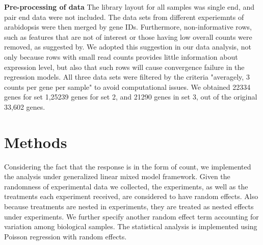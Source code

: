 \documentclass[11pt, a4paper]{article}
\begin{document}
\textbf{Pre-processing of data} The library layout for all samples was single end, and pair end data were not included. The data sets from different experiemnts of arabidopsis were then merged by gene IDs.  Furthermore, non-informative rows, such as features that are not of interest or those having low overall counts were removed, as suggested by\cite{anders2013count}. We adopted this suggestion in our data analysis, not only because rows with small read counts provides little information about expression level,  but also that such rows will cause convergence failure in the regression models. All three data sets  were filtered by the criteria "averagely, 3 counts per gene per sample" to avoid computational issues. We obtained 22334 genes for set 1,25239 genes for set 2, and 21290 genes in set 3, out of the original 33,602 genes. 

\section{Methods}
Considering the fact that the response is in the form of count, we implemented the analysis under generalized linear mixed model framework\nocite{mccullagh1989generalized}. Given the randomness of experimental data we collected, the experiments, as well as the treatments each experiment received, are considered to have random effects. Also because treatments are nested in experiments, they are treated as nested effects under experiments. We further specify another random effect term accounting for variation among biological samples.  The statistical analysis is implemented using Poisson regression with random effects.
\end{document}

